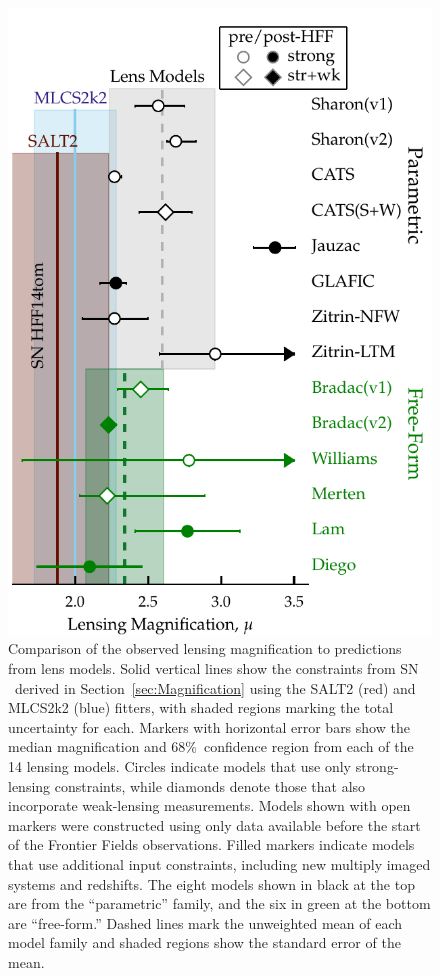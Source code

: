 \begin{figure}
\begin{center}
\includegraphics[width=\columnwidth]{FIG/snTomas_magnifications}
\caption{ 
Comparison of the observed lensing magnification to predictions from
lens models. Solid vertical lines show the constraints from SN \tomas\
derived in Section~\ref{sec:Magnification} using the SALT2 (red) and
MLCS2k2 (blue) fitters, with shaded regions marking the total
uncertainty for each. Markers with horizontal error bars show the
median magnification and 68\%\ confidence region from each of the 14
lensing models.  Circles indicate models that use only strong-lensing
constraints, while diamonds denote those that also incorporate
weak-lensing measurements.  Models shown with open markers were
constructed using only data available before the start of the Frontier
Fields observations.  Filled markers indicate models that use
additional input constraints, including new multiply imaged systems
and redshifts.  The eight models shown in black at the top are from
the ``parametric'' family, and the six in green at the bottom are
``free-form.''  Dashed lines mark the unweighted mean of each model
family and shaded regions show the standard error of the mean.
\label{fig:lensingtest} }
\end{center}
\end{figure}

